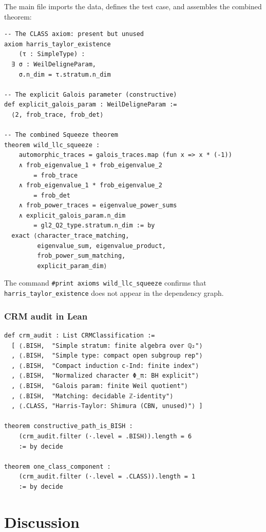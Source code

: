 \documentclass[11pt]{article}
\theoremstyle{plain}
\theoremstyle{definition}
\theoremstyle{remark}
\begin{document}
The main file imports the data, defines the test case, and
assembles the combined theorem:
\begin{lstlisting}
-- The CLASS axiom: present but unused
axiom harris_taylor_existence
    (τ : SimpleType) :
  ∃ σ : WeilDeligneParam,
    σ.n_dim = τ.stratum.n_dim

-- The explicit Galois parameter (constructive)
def explicit_galois_param : WeilDeligneParam :=
  ⟨2, frob_trace, frob_det⟩

-- The combined Squeeze theorem
theorem wild_llc_squeeze :
    automorphic_traces = galois_traces.map (fun x => x * (-1))
    ∧ frob_eigenvalue_1 + frob_eigenvalue_2
        = frob_trace
    ∧ frob_eigenvalue_1 * frob_eigenvalue_2
        = frob_det
    ∧ frob_power_traces = eigenvalue_power_sums
    ∧ explicit_galois_param.n_dim
        = gl2_Q2_type.stratum.n_dim := by
  exact ⟨character_trace_matching,
         eigenvalue_sum, eigenvalue_product,
         frob_power_sum_matching,
         explicit_param_dim⟩
\end{lstlisting}

The command \texttt{\#print axioms wild\_llc\_squeeze} confirms
that \texttt{harris\_taylor\_existence} does not appear in the
dependency graph.

\subsubsection*{CRM audit in Lean}

\begin{lstlisting}
def crm_audit : List CRMClassification :=
  [ ⟨.BISH,  "Simple stratum: finite algebra over ℚ₂"⟩
  , ⟨.BISH,  "Simple type: compact open subgroup rep"⟩
  , ⟨.BISH,  "Compact induction c-Ind: finite index"⟩
  , ⟨.BISH,  "Normalized character Φ_π: BH explicit"⟩
  , ⟨.BISH,  "Galois param: finite Weil quotient"⟩
  , ⟨.BISH,  "Matching: decidable ℤ-identity"⟩
  , ⟨.CLASS, "Harris-Taylor: Shimura (CBN, unused)"⟩ ]

theorem constructive_path_is_BISH :
    (crm_audit.filter (·.level = .BISH)).length = 6
    := by decide

theorem one_class_component :
    (crm_audit.filter (·.level = .CLASS)).length = 1
    := by decide
\end{lstlisting}

\section{Discussion}\label{sec:discuss}
\end{document}
